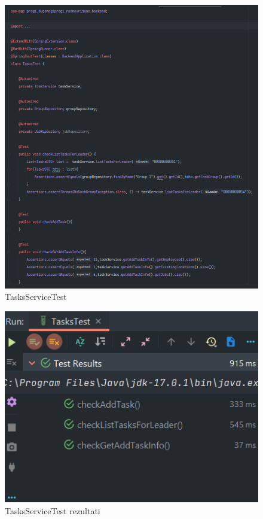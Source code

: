 				\begin{figure}[H] 					\centering 				\includegraphics[width=\textwidth]{Dokumentacija/ispit-komp/Taskstest.png}
				\caption{TasksServiceTest}
				\end{figure}
                \begin{figure}[H] 					\centering 					                    \includegraphics[width=\textwidth]{Dokumentacija/ispit-komp/TaskTestResult.png}
				\caption{TasksServiceTest rezultati}
				\end{figure}
				
